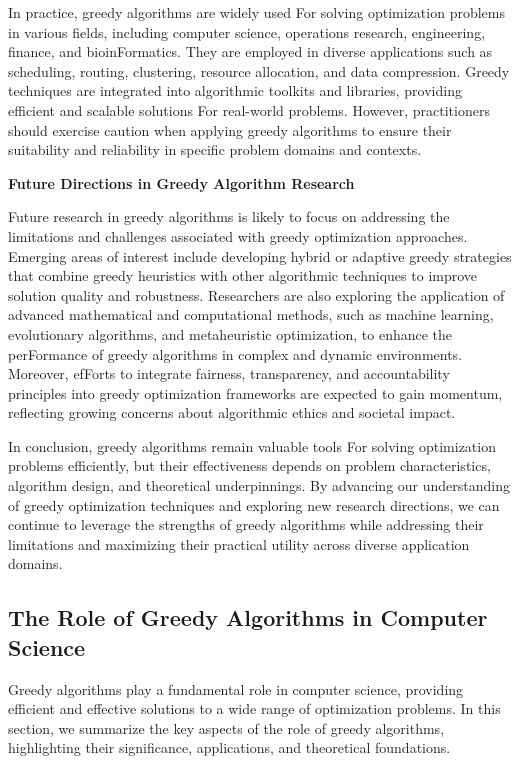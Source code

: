 \documentclass[12pt]{book} %
\begin{document}
In practice, greedy algorithms are widely used For solving optimization problems in various fields, including computer science, operations research, engineering, finance, and bioinFormatics. They are employed in diverse applications such as scheduling, routing, clustering, resource allocation, and data compression. Greedy techniques are integrated into algorithmic toolkits and libraries, providing efficient and scalable solutions For real-world problems. However, practitioners should exercise caution when applying greedy algorithms to ensure their suitability and reliability in specific problem domains and contexts.

\textbf{Future Directions in Greedy Algorithm Research}

Future research in greedy algorithms is likely to focus on addressing the limitations and challenges associated with greedy optimization approaches. Emerging areas of interest include developing hybrid or adaptive greedy strategies that combine greedy heuristics with other algorithmic techniques to improve solution quality and robustness. Researchers are also exploring the application of advanced mathematical and computational methods, such as machine learning, evolutionary algorithms, and metaheuristic optimization, to enhance the perFormance of greedy algorithms in complex and dynamic environments. Moreover, efForts to integrate fairness, transparency, and accountability principles into greedy optimization frameworks are expected to gain momentum, reflecting growing concerns about algorithmic ethics and societal impact.

In conclusion, greedy algorithms remain valuable tools For solving optimization problems efficiently, but their effectiveness depends on problem characteristics, algorithm design, and theoretical underpinnings. By advancing our understanding of greedy optimization techniques and exploring new research directions, we can continue to leverage the strengths of greedy algorithms while addressing their limitations and maximizing their practical utility across diverse application domains.


\subsection{The Role of Greedy Algorithms in Computer Science}


Greedy algorithms play a fundamental role in computer science, providing efficient and effective solutions to a wide range of optimization problems. In this section, we summarize the key aspects of the role of greedy algorithms, highlighting their significance, applications, and theoretical foundations.
\end{document}
